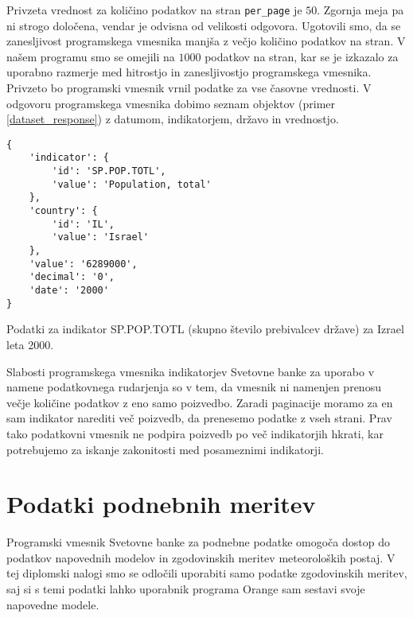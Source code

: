 
Privzeta vrednost za količino podatkov na stran \verb|per_page| je $50$. 
Zgornja meja pa ni strogo določena, vendar je odvisna od velikosti odgovora. 
Ugotovili smo, da se zanesljivost programskega vmesnika manjša z večjo 
količino podatkov na stran. V našem programu smo se omejili na $1000$ podatkov
na stran, kar se je izkazalo za uporabno razmerje med hitrostjo in 
zanesljivostjo programskega vmesnika. Privzeto bo programski vmesnik vrnil 
podatke za vse časovne vrednosti. V odgovoru programskega vmesnika dobimo seznam objektov 
(primer \ref{dataset_response}) z datumom, indikatorjem, državo in vrednostjo.

\begin{snippet}
\begin{center}
\begin{lstlisting}
{
    'indicator': {
        'id': 'SP.POP.TOTL',
        'value': 'Population, total'
    },
    'country': {
        'id': 'IL',
        'value': 'Israel'
    },
    'value': '6289000',
    'decimal': '0',
    'date': '2000'
}
\end{lstlisting}
\end{center}
\caption{Podatki za indikator SP.POP.TOTL (skupno število prebivalcev države) za Izrael leta
2000.}
\label{dataset_response}
\end{snippet} 

Slabosti programskega vmesnika indikatorjev Svetovne banke za uporabo v namene
podatkovnega rudarjenja so v tem, da vmesnik ni namenjen prenosu večje 
količine podatkov z eno samo poizvedbo. Zaradi paginacije moramo za en sam 
indikator narediti več poizvedb, da prenesemo podatke z vseh strani. Prav 
tako podatkovni vmesnik ne podpira poizvedb po več indikatorjih hkrati, kar
potrebujemo za iskanje zakonitosti med posameznimi indikatorji.

\section{Podatki podnebnih meritev}

Programski vmesnik Svetovne banke za podnebne podatke omogoča dostop do 
podatkov napovednih modelov in zgodovinskih meritev meteoroloških postaj. V tej 
diplomski nalogi smo se odločili uporabiti samo podatke zgodovinskih meritev, 
saj si s temi podatki lahko uporabnik programa Orange sam sestavi svoje 
napovedne modele.

